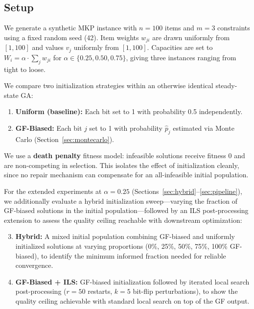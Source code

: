 \documentclass[twocolumn]{article}
\begin{document}
\subsection{Setup}

We generate a synthetic MKP instance with $n = 100$ items and $m = 3$ 
constraints using a fixed random seed (42). Item weights $w_{ji}$ are 
drawn uniformly from $[1, 100]$ and values $v_j$ uniformly from $[1, 100]$. 
Capacities are set to $W_i = \alpha \cdot \sum_j w_{ji}$ for 
$\alpha \in \{0.25, 0.50, 0.75\}$, giving three instances ranging from 
tight to loose.

We compare two initialization strategies within an otherwise identical 
steady-state GA:

\begin{enumerate}
    \item \textbf{Uniform (baseline):} Each bit set to 1 with probability 
    0.5 independently.
    \item \textbf{GF-Biased:} Each bit $j$ set to 1 with probability 
    $\hat{p}_j$ estimated via Monte Carlo (Section~\ref{sec:montecarlo}).
\end{enumerate}

We use a \textbf{death penalty} fitness model: infeasible solutions 
receive fitness 0 and are non-competing in selection. This isolates the 
effect of initialization cleanly, since no repair mechanism can 
compensate for an all-infeasible initial population.

For the extended experiments at $\alpha = 0.25$ 
(Sections~\ref{sec:hybrid}--\ref{sec:pipeline}), we additionally evaluate 
a hybrid initialization sweep---varying the fraction of GF-biased 
solutions in the initial population---followed by an ILS post-processing 
extension to assess the quality ceiling reachable with downstream 
optimization:

\begin{enumerate}
  \setcounter{enumi}{2}
    \item \textbf{Hybrid:} A mixed initial population combining GF-biased 
    and uniformly initialized solutions at varying proportions (0\%, 25\%, 
    50\%, 75\%, 100\% GF-biased), to identify the minimum informed 
    fraction needed for reliable convergence.
    \item \textbf{GF-Biased + ILS:} GF-biased initialization followed 
    by iterated local search post-processing ($r = 50$ restarts, 
    $k = 5$ bit-flip perturbations), to show the quality ceiling 
    achievable with standard local search on top of the GF output.
\end{enumerate}
\end{document}
